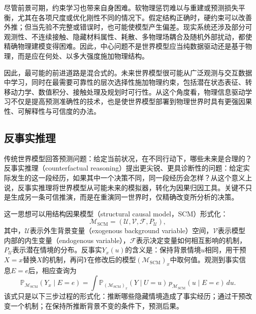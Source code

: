 尽管前景可期，约束学习也带来自身困难。软物理惩罚难以与重建或预测损失平衡，尤其在各项尺度或优化刚性不同的情况下。假定结构正确时，硬约束可以改善外推；但当先验不完整或错误时，也可能使模型产生偏差。现实系统还涉及部分可观测性、不连续接触、隐藏材料属性、耗散、多物理场耦合及随机外部扰动，都使精确物理建模变得困难。因此，中心问题不是世界模型应当纯数据驱动还是基于物理，而是应在何处、以多大强度施加物理结构。

因此，最可能的前进道路是混合式的。未来世界模型很可能从广泛观测与交互数据中学习，同时在最需要可靠性的层次选择性施加物理约束，包括潜在状态表征、转移动力学、数值积分、接触处理及规划时可行性。从这个角度看，物理信息驱动学习不仅是提高预测准确性的技术，也是使世界模型部署到物理世界时具有更强因果性、可解释性与可信度的办法。

\subsection{反事实推理}
传统世界模型回答预测问题：给定当前状况，在不同行动下，哪些未来是合理的？反事实推理（counterfactual reasoning）提出更尖锐、更具诊断性的问题：给定实际发生的这一段经历，如果其中一个决策不同，同一段经历会怎样？从这个意义上说，反事实推理将世界模型从可能未来的模拟器，转化为因果归因工具。关键不只是生成另一条可信推演，而是在重演同一世界时，仅精确改变所分析的决策。

这一思想可以用结构因果模型（structural causal model，SCM）形式化：
\begin{equation}
    \mathcal{M}_{\mathrm{SCM}}
    =
    (\mathcal{U},\mathcal{V},\mathcal{F},P_{\mathcal{U}}),
\end{equation}
其中，$\mathcal{U}$表示外生背景变量（exogenous background variable）空间，$\mathcal{V}$表示模型内部的内生变量（endogenous variable），$\mathcal{F}$表示决定变量如何相互影响的机制，$P_{\mathcal{U}}$表示潜在情境的分布。反事实\(Y_x(u)\)的含义是：保持背景情境\(u\)相同，用干预\(X=x\)替换\(X\)的机制，再问\(Y\)在修改后的模型$(\mathcal{M}_{\mathrm{SCM}})_x$中取何值。观测到事实信息\(E=e\)后，相应查询为
\begin{equation}
    \mathbb{P}_{\mathcal{M}_{\mathrm{SCM}}}(Y_x \mid E=e)
    =
    \int
    \mathbb{P}_{(\mathcal{M}_{\mathrm{SCM}})_x}(Y\mid U=u)\,
    p_{\mathcal{M}_{\mathrm{SCM}}}(u\mid E=e)\,du .
\end{equation}
该式只是以下三步过程的形式化：推断哪些隐藏情境造成了事实经历；通过干预改变一个机制；在保持所推断背景不变的条件下，预测后果\citep{pearl2009causality,rubin1974estimating}。

